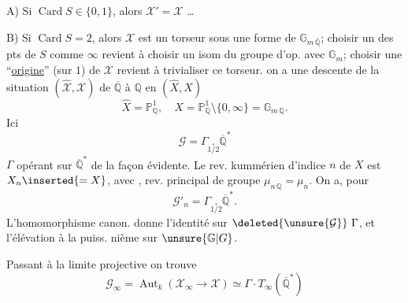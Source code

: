 A) Si $\operatorname{Card}S\in\{0,1\}$, alors $\mathcal X'=\mathcal X$ \ldots

B) Si $\operatorname{Card}S=2$, alors $\mathcal X$ est  un torseur sous une forme de $\mathbb G_{m\,\overline{\mathbb Q}}$;
 choisir un des pts de $S$ comme $\infty$  revient à choisir un isom du  groupe d'op. avec $\mathbb G_m$; choisir une ``\uline{origine}'' (sur $1$) de $\mathcal X$ revient à trivialiser ce torseur.
  on a une descente de la situation $(\widehat{\mathcal X},\mathcal X)$ de $\overline{\mathbb Q}$ à $\mathbb Q$ en $(\widehat X,X)$
\[
\widehat X=\mathbb P^1_{\mathbb Q},\quad X=\mathbb P^1_{\mathbb Q}\setminus\{0,\infty\}=\mathbb G_{m\,\mathbb Q}.
\]
Ici
\[
\mathcal G=\Gamma\mathbin{\underset{\scriptscriptstyle 1/2}{.}}\overline{\mathbb Q}^{*}
\]
$\Gamma$ opérant sur $\overline{\mathbb Q}^{*}$ de la façon évidente. Le rev. kummérien d'indice $n$ de $X$ est $X_n\inserted{=X}$, avec
,
rev. principal de groupe $\mu_{n\,\mathbb Q}=\mu_n$.
On a, pour
\[
\mathcal G'_n=\Gamma\mathbin{\underset{\scriptscriptstyle 1/2}{.}}\overline{\mathbb Q}^{*}.
\]
L'homomorphisme canon.
donne l'identité sur $\deleted{\unsure{\mathcal G}}\ \Gamma$, et l'élévation à la puiss. nième sur $\unsure{\mathbb G|G}$.

Passant à la limite projective on trouve
\[
\mathcal G_\infty=\operatorname{Aut}_k(\mathcal X_\infty\to\mathcal X)\simeq\Gamma\cdot T_\infty(\overline{\mathbb Q}^{*})
\]

